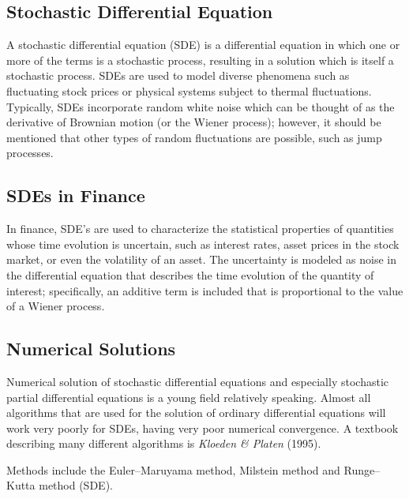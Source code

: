 \documentclass[12pt]{article}
\begin{document}
\subsection{Stochastic Differential Equation}
A stochastic differential equation (SDE) is a differential equation in which one or more of the terms is a stochastic process, resulting in a solution which is itself a stochastic process. SDEs are used to model diverse phenomena such as fluctuating stock prices or physical systems subject to thermal fluctuations. Typically, SDEs incorporate random white noise which can be thought of as the derivative of Brownian motion (or the Wiener process); however, it should be mentioned that other types of random fluctuations are possible, such as jump processes.

\subsection{SDEs in Finance}

In finance, SDE’s are used to characterize the statistical properties of quantities whose time evolution is uncertain, such as interest rates, asset prices in the stock market, or even the volatility of an asset. The uncertainty is modeled as noise in the differential equation that describes the time evolution of the quantity of interest; specifically, an additive term is included that is proportional to the value of a Wiener process.


\subsection{Numerical Solutions}
Numerical solution of stochastic differential equations and especially stochastic partial differential equations is a young field relatively speaking. Almost all algorithms that are used for the solution of ordinary differential equations will work very poorly for SDEs, having very poor numerical convergence. A textbook describing many different algorithms is \textit{Kloeden \& Platen} (1995).

Methods include the Euler–Maruyama method, Milstein method and Runge–Kutta method (SDE).
\end{document}
